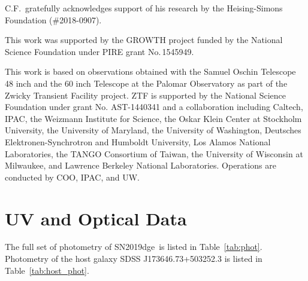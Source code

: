\documentclass[twocolumn]{aastex63}
\newcommand{\name}{SN2019dge}
\begin{document}
\begin{CJK*}{UTF8}{gbsn}
C.F.~gratefully acknowledges support of his research by the Heising-Simons Foundation 
(\#2018-0907).

This work was supported by the GROWTH project funded by the National Science Foundation under 
PIRE grant No.\,1545949. 

This work is based on observations obtained with the Samuel Oschin Telescope 48 inch and the 60 
inch Telescope at the Palomar Observatory as part of the Zwicky Transient Facility project. ZTF is 
supported by the National Science Foundation under grant No. AST-1440341 and a collaboration 
including Caltech, IPAC, the Weizmann Institute for Science, the Oskar Klein Center at Stockholm 
University, the University of Maryland, the University of Washington, Deutsches 
Elektronen-Synchrotron and Humboldt University, Los Alamos National Laboratories, the TANGO 
Consortium of Taiwan, the University of Wisconsin at Milwaukee, and Lawrence Berkeley National 
Laboratories. Operations are conducted by COO, IPAC, and UW. 



\appendix

\section{UV and Optical Data} \label{sec:appphot_data}


The full set of photometry of \name\ is listed in Table~\ref{tab:phot}. Photometry of the host 
galaxy SDSS J173646.73+503252.3 is listed in Table~\ref{tab:host_phot}.



\end{CJK*}
\end{document}

